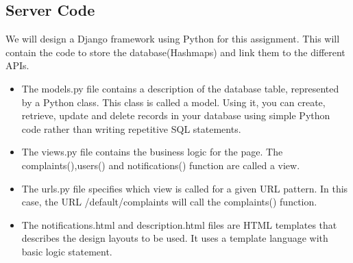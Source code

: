 \documentclass[a4paper]{article}
\begin{document}
\subsection{Server Code}
We will design a Django framework using Python for this assignment. This will contain the code to store the database(Hashmaps) and link them to the different APIs.
\begin{itemize}
\item The models.py file contains a description of the database table, represented by a Python class. This class is called a model. Using it, you can create, retrieve, update and delete records in your database using simple Python code rather than writing repetitive SQL statements.
\item The views.py file contains the business logic for the page. The complaints(),users() and notifications() function are called a view.
\item The urls.py file specifies which view is called for a given URL pattern. In this case, the URL /default/complaints will call the complaints() function.
\item The notifications.html and description.html files are HTML templates that describes the design layouts to be used. It uses a template language with basic logic statement.

\end{itemize}
\end{document}
